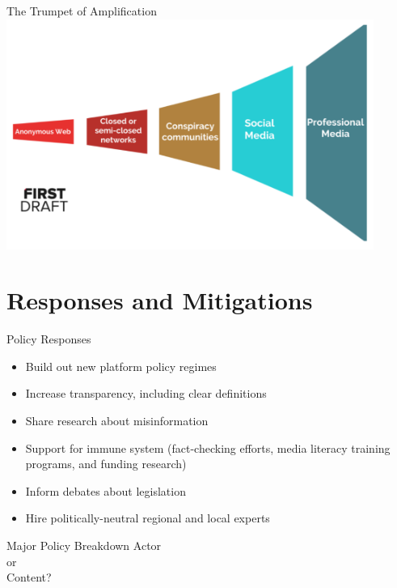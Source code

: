 \documentclass[nobackground,dvipsnames,table,aspectratio=169]{beamer}
\begin{document}
\begin{frame}{The Trumpet of Amplification}
    \includegraphics[width=0.9\textwidth]{amplification-trumpet}
\end{frame}

\section{Responses and Mitigations}

\begin{frame}{Policy Responses}
    \large
    \begin{itemize}
        \item Build out new platform policy regimes
        \item Increase transparency, including clear definitions
        \item Share research about misinformation
        \item Support for immune system (fact-checking efforts, media literacy training programs, and funding research)
        \item Inform debates about legislation
        \item Hire politically-neutral regional and local experts
    \end{itemize}
\end{frame}

\begin{frame}{Major Policy Breakdown}
    \centering
    \LARGE
    Actor\\
    or\\
    Content?
\end{frame}
\end{document}
